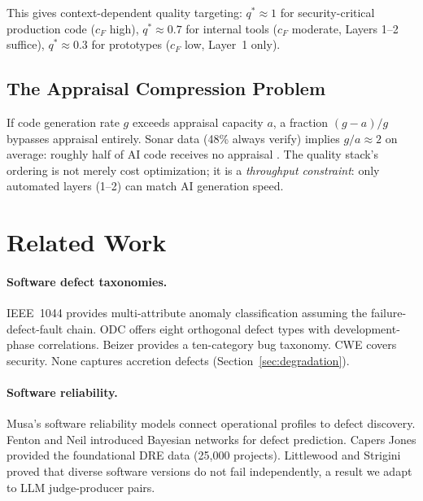 \documentclass[11pt, a4paper]{article}
\theoremstyle{definition}
\theoremstyle{remark}
\begin{document}
This gives context-dependent quality targeting: $q^* \approx 1$ for security-critical production code ($c_F$ high), $q^* \approx 0.7$ for internal tools ($c_F$ moderate, Layers 1--2 suffice), $q^* \approx 0.3$ for prototypes ($c_F$ low, Layer~1 only).

\subsection{The Appraisal Compression Problem}

If code generation rate $g$ exceeds appraisal capacity $a$, a fraction $(g-a)/g$ bypasses appraisal entirely. Sonar data (48\% always verify) implies $g/a \approx 2$ on average: roughly half of AI code receives no appraisal \citep{sonar2026}. The quality stack's ordering is not merely cost optimization; it is a \emph{throughput constraint}: only automated layers (1--2) can match AI generation speed.


\section{Related Work}
\label{sec:related}

\paragraph{Software defect taxonomies.} IEEE~1044 \citep{ieee1044} provides multi-attribute anomaly classification assuming the failure-defect-fault chain. ODC \citep{chillarege1992} offers eight orthogonal defect types with development-phase correlations. Beizer \citep{beizer1990} provides a ten-category bug taxonomy. CWE covers security. None captures accretion defects (Section~\ref{sec:degradation}).

\paragraph{Software reliability.} Musa's software reliability models \citep{musa1987} connect operational profiles to defect discovery. Fenton and Neil \citep{fenton1999} introduced Bayesian networks for defect prediction. Capers Jones \citep{capersjones2012} provided the foundational DRE data (25,000 projects). Littlewood and Strigini \citep{littlewood1993, littlewood2000} proved that diverse software versions do not fail independently, a result we adapt to LLM judge-producer pairs.
\end{document}
